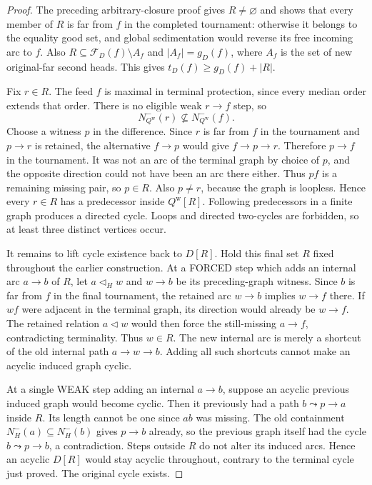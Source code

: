 \begin{proof}
The preceding arbitrary-closure proof gives $R\ne\varnothing$ and
shows that every member of $R$ is far from $f$ in the completed
tournament: otherwise it belongs to the equality good set, and
global sedimentation would reverse its free incoming arc to $f$.
Also $R\subseteq\mathcal F_D(f)\setminus A_f$ and
$|A_f|=g_D(f)$, where $A_f$ is the set of new original-far second heads.
This gives $t_D(f)\ge g_D(f)+|R|$.

Fix $r\in R$. The feed $f$ is maximal in terminal protection, since
every median order extends that order. There is no eligible weak
$r\to f$ step, so
\[
 N_{Q^{\mathrm w}}^-(r)\not\subseteq N_{Q^{\mathrm w}}^-(f).
\]
Choose a witness $p$ in the difference. Since $r$ is far from $f$
in the tournament and $p\to r$ is retained, the alternative $f\to p$
would give $f\to p\to r$. Therefore $p\to f$ in the tournament.
It was not an arc of the terminal graph by choice of $p$, and the
opposite direction could not have been an arc there either. Thus
$pf$ is a remaining missing pair, so $p\in R$. Also $p\ne r$,
because the graph is loopless. Hence every $r\in R$ has a predecessor
inside $Q^{\mathrm w}[R]$. Following predecessors in a finite graph
produces a directed cycle. Loops and directed two-cycles are forbidden,
so at least three distinct vertices occur.

It remains to lift cycle existence back to $D[R]$. Hold this final set
$R$ fixed throughout the earlier construction. At a FORCED step which
adds an internal arc $a\to b$ of $R$, let $a\triangleleft_H w$ and
$w\to b$ be its preceding-graph witness. Since $b$ is far from $f$ in
the final tournament, the retained arc $w\to b$ implies $w\to f$ there.
If $wf$ were adjacent in the terminal graph, its direction would already
be $w\to f$. The retained relation $a\triangleleft w$ would then force
the still-missing $a\to f$, contradicting terminality. Thus $w\in R$.
The new internal arc is merely a shortcut of the old internal path
$a\to w\to b$. Adding all such shortcuts cannot make an acyclic
induced graph cyclic.

At a single WEAK step adding an internal $a\to b$, suppose an acyclic
previous induced graph would become cyclic. Then it previously had a
path $b\leadsto p\to a$ inside $R$. Its length cannot be one since
$ab$ was missing. The old containment $N_H^-(a)\subseteq N_H^-(b)$
gives $p\to b$ already, so the previous graph itself had the cycle
$b\leadsto p\to b$, a contradiction. Steps outside $R$ do not alter its
induced arcs. Hence an acyclic $D[R]$ would stay acyclic throughout,
contrary to the terminal cycle just proved. The original cycle exists.
\end{proof}

